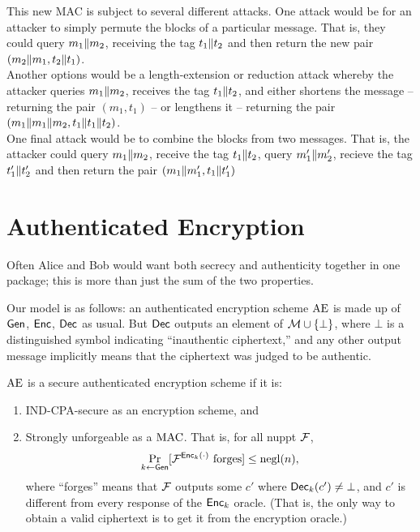 \documentclass[11pt]{article}
\begin{document}
\begin{answer}
  This new MAC is subject to several different attacks. One attack
  would be for an attacker to simply permute the blocks of a
  particular message. That is, they could query \(m_1 \| m_2\),
  receiving the tag \(t_1 \| t_2\) and then return the
  new pair \((m_2 \| m_1, t_2 \| t_1)\). \\

  \noindent Another options would be a length-extension or reduction
  attack whereby the attacker queries \(m_1 \| m_2\), receives
  the tag \(t_1 \| t_2\), and either shortens the message --
  returning the pair \((m_1, t_1)\) -- or lengthens it -- returning
  the pair \((m_1 \| m_1 \| m_2, t_1
  \| t_1 \| t_2)\). \\

  \noindent One final attack would be to combine the blocks from two
  messages. That is, the attacker could query \(m_1 \| m_2\),
  receive the tag \(t_1 \| t_2\), query \(m_1' \| m_2'\),
  recieve the tag \(t_1' \| t_2'\) and then return the pair
  \((m_1 \| m_1', t_1 \| t_1')\)
\end{answer}

\section{Authenticated Encryption}
\label{sec:auth-encrypt}

Often Alice and Bob would want both secrecy and authenticity together
in one package; this is more than just the sum of the two properties.

Our model is as follows: an authenticated encryption scheme
$\text{AE}$ is made up of $\mathsf{Gen}$, $\mathsf{Enc}$, $\mathsf{Dec}$ as usual.
But $\mathsf{Dec}$ outputs an element of $\mathcal{M} \cup \{\bot\}$, where
$\bot$ is a distinguished symbol indicating ``inauthentic
ciphertext,'' and any other output message implicitly means that the
ciphertext was judged to be authentic.

\begin{definition}
  $\text{AE}$ is a secure authenticated encryption scheme if it is:
  \begin{enumerate}
  \item IND-CPA-secure as an encryption scheme, and
  \item Strongly unforgeable as a $\text{MAC}$.  That is, for all nuppt
    $\mathcal{F}$,
    \[
    \Pr_{k \gets \mathsf{Gen}}[\mathcal{F}^{\mathsf{Enc}_k(\cdot)} \text{ forges}] \leq \operatorname{negl}(n),
    \]
    where ``forges'' means that $\mathcal{F}$ outputs some $c'$ where
    $\mathsf{Dec}_k(c') \neq \bot$, and $c'$ is different from every
    response of the $\mathsf{Enc}_{k}$ oracle.  (That is, the only way to
    obtain a valid ciphertext is to get it from the encryption
    oracle.)
  \end{enumerate}
\end{definition}
\end{document}
